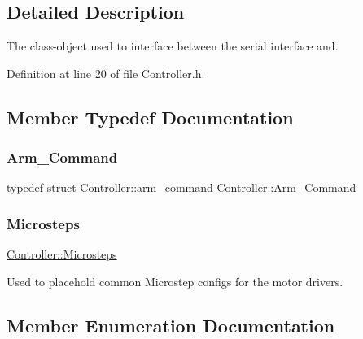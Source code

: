 \subsection{Detailed Description}
The class-\/object used to interface between the serial interface and. 

Definition at line 20 of file Controller.\+h.



\subsection{Member Typedef Documentation}
\mbox{\label{class_controller_a1b06b7601d97a4d4bb4071938df87076}} 
\subsubsection{\texorpdfstring{Arm\+\_\+\+Command}{Arm\_Command}}
{\footnotesize\ttfamily typedef struct \hyperlink{struct_controller_1_1arm__command}{Controller\+::arm\+\_\+command}  \hyperlink{class_controller_a1b06b7601d97a4d4bb4071938df87076}{Controller\+::\+Arm\+\_\+\+Command}}

\mbox{\label{class_controller_ab45ad0d63abd4b57021f13810fc856d3}} 
\subsubsection{\texorpdfstring{Microsteps}{Microsteps}}
{\footnotesize\ttfamily \hyperlink{class_controller_ab45ad0d63abd4b57021f13810fc856d3}{Controller\+::\+Microsteps}}



Used to placehold common Microstep configs for the motor drivers. 



\subsection{Member Enumeration Documentation}
\mbox{\label{class_controller_a91a5751dd6920daf3b70814171b51767}} 
